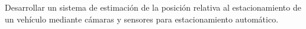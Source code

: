 
Desarrollar un sistema de estimación de la posición relativa al estacionamiento de un vehículo mediante cámaras y sensores para estacionamiento automático.
